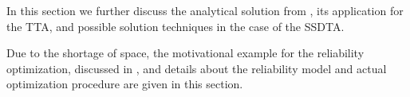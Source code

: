 \renewcommand{\thesection}{S\arabic{section}}
\renewcommand{\thetable}{S\arabic{table}}
\renewcommand{\thefigure}{S\arabic{figure}}
\setcounter{table}{0}
\setcounter{figure}{0}

 \label{app:thermal-circuits}


In this section we further discuss the analytical solution from , its application for the TTA, and possible solution techniques in the case of the SSDTA.

 \label{app:tta-analytical}


 \label{app:straight-forward}


\balance
{} \label{app:reliability-optimization}
Due to the shortage of space, the motivational example for the reliability optimization, discussed in , and details about the reliability model and actual optimization procedure are given in this section.



 \label{app:genetic-algorithm}

